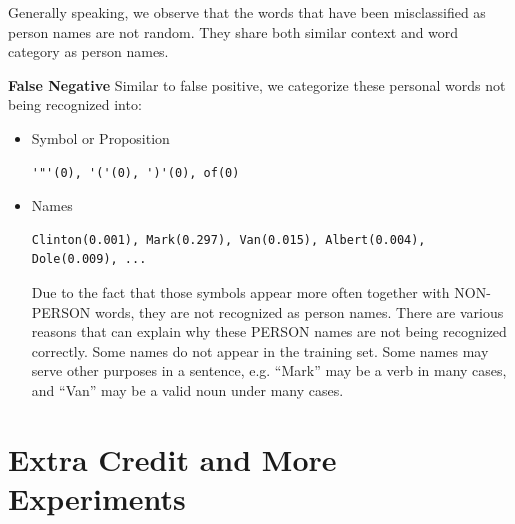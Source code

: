\documentclass[letterpaper]{article}
\begin{document}
Generally speaking, we observe that the words that have been misclassified as person names are not random. They share both similar context and word category as person names.

\vspace{0.1cm}

\textbf{False Negative} Similar to false positive, we categorize these personal words not being recognized into:
\begin{itemize}
\item Symbol or Proposition
\begin{verbatim}
'"'(0), '('(0), ')'(0), of(0)
\end{verbatim}
\item Names
\begin{verbatim}
Clinton(0.001), Mark(0.297), Van(0.015), Albert(0.004), Dole(0.009), ...
\end{verbatim}

Due to the fact that those symbols appear more often together with NON-PERSON words, they are not recognized as person names. There are various reasons that can explain why these PERSON names are not being recognized correctly. Some names do not appear in the training set. Some names may serve other purposes in a sentence, e.g. ``Mark'' may be a verb in many cases, and ``Van'' may be a valid noun under many cases.
\end{itemize}


\section{Extra Credit and More Experiments}
\end{document}
